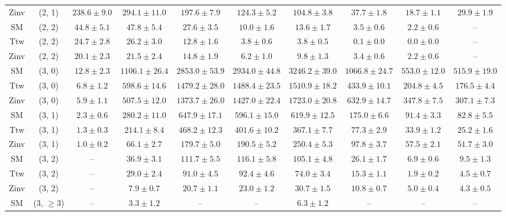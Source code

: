 \begin{table}[h!]
{\begin{tabular}{cccccccccc}
	Zinv & (2, 1) & $238.6\pm 9.0$ & $294.1\pm 11.0$ & $197.6\pm 7.9$ & $124.3\pm 5.2$ & $104.8\pm 3.8$ & $37.7\pm 1.8$ & $18.7\pm 1.1$ & $29.9\pm 1.9$ \\[0.5ex] 
	SM & (2, 2) & $44.8\pm 5.1$ & $47.8\pm 5.4$ & $27.6\pm 3.5$ & $10.0\pm 1.6$ & $13.6\pm 1.7$ & $3.5\pm 0.6$ & $2.2\pm 0.6$ & -- \\[0.5ex] 
	Ttw & (2, 2) & $24.7\pm 2.8$ & $26.2\pm 3.0$ & $12.8\pm 1.6$ & $3.8\pm 0.6$ & $3.8\pm 0.5$ & $0.1\pm 0.0$ & $0.0\pm 0.0$ & -- \\[0.5ex] 
	Zinv & (2, 2) & $20.1\pm 2.3$ & $21.5\pm 2.4$ & $14.8\pm 1.9$ & $6.2\pm 1.0$ & $9.8\pm 1.3$ & $3.4\pm 0.6$ & $2.2\pm 0.6$ & -- \\[0.5ex] 
	SM & (3, 0) & $12.8\pm 2.3$ & $1106.1\pm 26.4$ & $2853.0\pm 53.9$ & $2934.0\pm 44.8$ & $3246.2\pm 39.0$ & $1066.8\pm 24.7$ & $553.0\pm 12.0$ & $515.9\pm 19.0$ \\[0.5ex] 
	Ttw & (3, 0) & $6.8\pm 1.2$ & $598.6\pm 14.6$ & $1479.2\pm 28.0$ & $1488.4\pm 23.5$ & $1510.9\pm 18.2$ & $433.9\pm 10.1$ & $204.8\pm 4.5$ & $176.5\pm 4.4$ \\[0.5ex] 
	Zinv & (3, 0) & $5.9\pm 1.1$ & $507.5\pm 12.0$ & $1373.7\pm 26.0$ & $1427.0\pm 22.4$ & $1723.0\pm 20.8$ & $632.9\pm 14.7$ & $347.8\pm 7.5$ & $307.1\pm 7.3$ \\[0.5ex] 
	SM & (3, 1) & $2.3\pm 0.6$ & $280.2\pm 11.0$ & $647.9\pm 17.1$ & $596.1\pm 15.0$ & $619.9\pm 12.5$ & $175.0\pm 6.6$ & $91.4\pm 3.3$ & $82.8\pm 5.5$ \\[0.5ex] 
	Ttw & (3, 1) & $1.3\pm 0.3$ & $214.1\pm 8.4$ & $468.2\pm 12.3$ & $401.6\pm 10.2$ & $367.1\pm 7.7$ & $77.3\pm 2.9$ & $33.9\pm 1.2$ & $25.2\pm 1.6$ \\[0.5ex] 
	Zinv & (3, 1) & $1.0\pm 0.2$ & $66.1\pm 2.7$ & $179.7\pm 5.0$ & $190.5\pm 5.2$ & $250.4\pm 5.3$ & $97.8\pm 3.7$ & $57.5\pm 2.1$ & $51.7\pm 3.0$ \\[0.5ex] 
	SM & (3, 2) & -- & $36.9\pm 3.1$ & $111.7\pm 5.5$ & $116.1\pm 5.8$ & $105.1\pm 4.8$ & $26.1\pm 1.7$ & $6.9\pm 0.6$ & $9.5\pm 1.3$ \\[0.5ex] 
	Ttw & (3, 2) & -- & $29.0\pm 2.4$ & $91.0\pm 4.5$ & $92.4\pm 4.6$ & $74.0\pm 3.4$ & $15.3\pm 1.1$ & $1.9\pm 0.2$ & $4.5\pm 0.7$ \\[0.5ex] 
	Zinv & (3, 2) & -- & $7.9\pm 0.7$ & $20.7\pm 1.1$ & $23.0\pm 1.2$ & $30.7\pm 1.5$ & $10.8\pm 0.7$ & $5.0\pm 0.4$ & $4.3\pm 0.5$ \\[0.5ex] 
	SM & (3, $\ge3$) & -- & $3.3\pm 1.2$ & -- & -- & $6.3\pm 1.2$ & -- & -- & -- \\[0.5ex] 

\end{tabular}}
\end{table}
